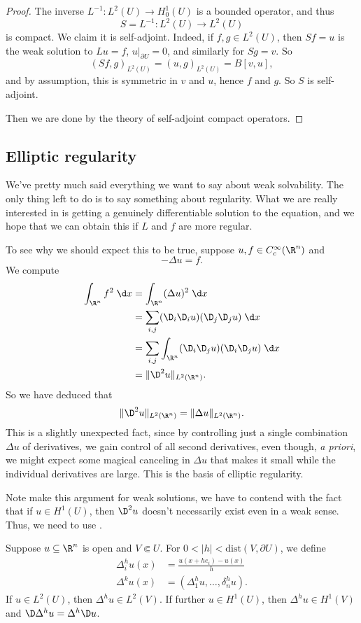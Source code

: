\documentclass[a4paper]{article}
\begin{document}
\begin{proof}
  The inverse $L^{-1}: L^2(U) \to H_0^1(U)$ is a bounded operator, and thus
  \[
    S = L^{-1}: L^2(U) \to L^2(U)
  \]
  is compact. We claim it is self-adjoint. Indeed, if $f, g \in L^2(U)$, then $Sf = u$ is the weak solution to $Lu = f$, $u|_{\partial U} = 0$, and similarly for $Sg = v$. So
  \[
    (Sf, g)_{L^2(U)} = (u, g)_{L^2(U)} = B[v, u],
  \]
  and by assumption, this is symmetric in $v$ and $u$, hence $f$ and $g$. So $S$ is self-adjoint.

  Then we are done by the theory of self-adjoint compact operators.
\end{proof}

\subsection{Elliptic regularity}
We've pretty much said everything we want to say about weak solvability. The only thing left to do is to say something about regularity. What we are really interested in is getting a genuinely differentiable solution to the equation, and we hope that we can obtain this if $L$ and $f$ are more regular.

To see why we should expect this to be true, suppose $u, f \in C_c^\infty(\R^n)$ and
\[
  -\Delta u = f.
\]
We compute
\begin{align*}
  \int_{\R^n} f^2 \;\d x &= \int_{\R^n} (\Delta u)^2\;\d x \\
  &= \sum_{i, j} (\D_i \D_i u)(\D_j \D_j u)\;\d x\\
  &= \sum_{i ,j} \int_{\R^n} (\D_i \D_j u) (\D_i \D_j u) \;\d x\\
  &= \|\D^2 u\|_{L^2(\R^n)}.
\end{align*}
So we have deduced that
\[
  \|\D^2 u\|_{L^2(\R^n)} = \| \Delta u\|_{L^2(\R^n)}.
\]
This is a slightly unexpected fact, since by controlling just a single combination $\Delta u$ of derivatives, we gain control of all second derivatives, even though, \emph{a priori}, we might expect some magical canceling in $\Delta u$ that makes it small while the individual derivatives are large. This is the basis of elliptic regularity.

Note make this argument for weak solutions, we have to contend with the fact that if $u \in H^1(U)$, then $\D^2 u$ doesn't necessarily exist even in a weak sense. Thus, we need to use .

Suppose $u \subseteq \R^n$ is open and $V \Subset U$. For $0 < |h| < \mathrm{dist}(V, \partial U)$, we define
\begin{align*}
  \Delta_i^h u(x) &= \frac{u(x + h e_i) - u(x)}{h}\\
  \Delta^k u(x) &= (\Delta_1^h u, \ldots, \delta^h_n u).
\end{align*}
If $u \in L^2(U)$, then $\Delta^h u \in L^2(V)$. If further $u \in H^1(U)$, then $\Delta^h u \in H^1(V)$ and $\D \Delta^h u = \Delta^h \D u$.
\end{document}

